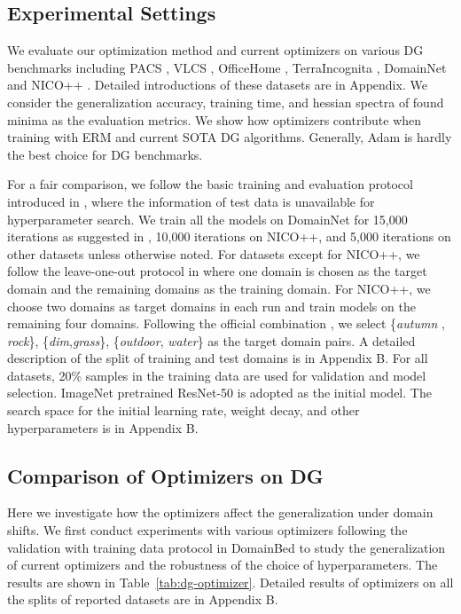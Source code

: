\subsection{Experimental Settings}
We evaluate our optimization method and current optimizers on various DG benchmarks including PACS \cite{li2017deeper}, VLCS \cite{fang2013unbiased}, OfficeHome \cite{venkateswara2017deep}, TerraIncognita \cite{beery2018recognition}, DomainNet \cite{peng2019moment} and NICO++ \cite{zhang2022nico++}. Detailed introductions of these datasets are in Appendix. We consider the generalization accuracy, training time, and hessian spectra of found minima as the evaluation metrics. We show how optimizers contribute when training with ERM and current SOTA DG algorithms. Generally, Adam is hardly the best choice for DG benchmarks. 



For a fair comparison, we follow the basic training and evaluation protocol introduced in \cite{gulrajani2020search}, where the information of test data is unavailable for hyperparameter search. 
We train all the models on DomainNet for 15,000 iterations as suggested in \cite{cha2021swad}, 10,000 iterations on NICO++, and 5,000 iterations on other datasets unless otherwise noted. 
For datasets except for NICO++, we follow the leave-one-out protocol in \cite{gulrajani2020search} where one domain is chosen as the target domain and the remaining domains as the training domain.
For NICO++, we choose two domains as target domains in each run and train models on the remaining four domains. Following the official combination \cite{zhang2022nico++}, we select \{\textit{autumn
}, \textit{rock}\}, \{\textit{dim},\textit{grass}\}, \{\textit{outdoor}, \textit{water}\} as the target domain pairs. A detailed description of the split of training and test domains is in Appendix B. 
For all datasets, 20\% samples in the training data are used for validation and model selection. ImageNet \cite{deng2009imagenet} pretrained ResNet-50 \cite{he2016deep} is adopted as the initial model. The search space for the initial learning rate, weight decay, and other hyperparameters is in Appendix B.

\subsection{Comparison of Optimizers on DG}

Here we investigate how the optimizers affect the generalization under domain shifts. We first conduct experiments with various optimizers following the validation with training data protocol in DomainBed \cite{gulrajani2020search} to study the generalization of current optimizers and the robustness of the choice of hyperparameters. The results are shown in Table~\ref{tab:dg-optimizer}. Detailed results of optimizers on all the splits of reported datasets are in Appendix B.

